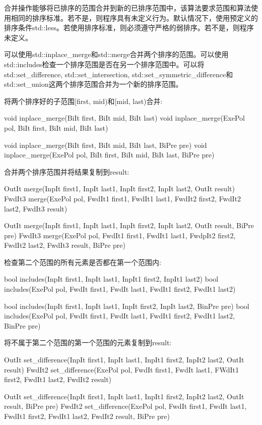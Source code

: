 合并操作能够将已排序的范围合并到新的已排序范围中，该算法要求范围和算法使用相同的排序标准。若不是，则程序具有未定义行为。默认情况下，使用预定义的排序条件std::less。若使用排序标准，则必须遵守严格的弱排序。若不是，则程序未定义。

可以使用std::inplace\_merge和std::merge合并两个排序的范围。可以使用std::includes检查一个排序范围是否在另一个排序范围中。可以将std::set\_difference, std::set\_intersection, std::set\_symmetric\_difference和std::set\_union这两个排序范围合并为一个新的排序范围。

将两个排序好的子范围[first, mid)和[mid, last)合并:

\begin{cpp}
void inplace_merge(BiIt first, BiIt mid, BiIt last)
void inplace_merge(ExePol pol, BiIt first, BiIt mid, BiIt last)

void inplace_merge(BiIt first, BiIt mid, BiIt last, BiPre pre)
void inplace_merge(ExePol pol, BiIt first, BiIt mid, BiIt last, BiPre pre)
\end{cpp}

合并两个排序范围并将结果复制到result:

\begin{cpp}
OutIt merge(InpIt first1, InpIt last1, InpIt first2, InpIt last2, OutIt result)
FwdIt3 merge(ExePol pol, FwdIt1 first1, FwdIt1 last1,
		     FwdIt2 first2, FwdIt2 last2, FwdIt3 result)

OutIt merge(InpIt first1, InpIt last1, InpIt first2, InpIt last2, OutIt result,
			BiPre pre)
FwdIt3 merge(ExePol pol, FwdIt1 first1, FwdIt1 last1,
			 FwdpIt2 first2, FwdIt2 last2, FwdIt3 result, BiPre pre)
\end{cpp}

检查第二个范围的所有元素是否都在第一个范围内:

\begin{cpp}
bool includes(InpIt first1, InpIt last1, InpIt1 first2, InpIt1 last2)
bool includes(ExePol pol, FwdIt first1, FwdIt last1, FwdIt1 first2, FwdIt1 last2)

bool includes(InpIt first1, InpIt last1, InpIt first2, InpIt last2, BinPre pre)
bool includes(ExePol pol, FwdIt first1, FwdIt last1,
			  FwdIt1 first2, FwdIt1 last2, BinPre pre)
\end{cpp}

将不属于第二个范围的第一个范围的元素复制到result:

\begin{cpp}
OutIt set_difference(InpIt first1, InpIt last1, InpIt1 first2, InpIt2 last2,
					 OutIt result)
FwdIt2 set_difference(ExePol pol, FwdIt first1, FwdIt last1,
					  FWdIt1 first2, FwdIt1 last2, FwdIt2 result)
					  
OutIt set_difference(InpIt first1, InpIt last1, InpIt1 first2, InpIt2 last2,
					 OutIt result, BiPre pre)
FwdIt2 set_difference(ExePol pol, FwdIt first1, FwdIt last1,
					  FwdIt1 first2, FwdIt1 last2, FwdIt2 result, BiPre pre)
\end{cpp}

